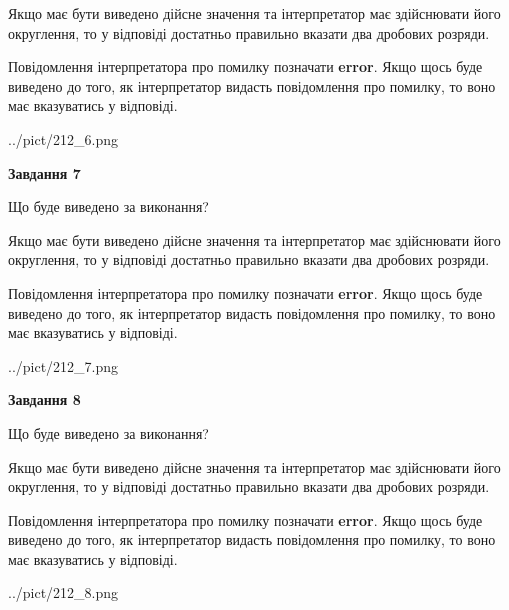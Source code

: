 \documentclass[12pt, ukrainian]{article}
\begin{document}
{\begin {Large}
Якщо має бути виведено дійсне значення та інтерпретатор має здійснювати його округлення, 
то у відповіді достатньо правильно вказати два дробових розряди.

Повідомлення інтерпретатора про помилку позначати \textbf{error}.
Якщо щось буде виведено до того, як інтерпретатор видасть повідомлення про помилку, 
то воно має вказуватись у відповіді. \par

\begin{center}
	{../pict/212_6.png}
\end{center}
\newpage

{\begin {center}\textbf{Завдання 7}\end {center}}\par
Що буде виведено за виконання? \par

Якщо має бути виведено дійсне значення та інтерпретатор має здійснювати його округлення, 
то у відповіді достатньо правильно вказати два дробових розряди.

Повідомлення інтерпретатора про помилку позначати \textbf{error}.
Якщо щось буде виведено до того, як інтерпретатор видасть повідомлення про помилку, 
то воно має вказуватись у відповіді. \par

\begin{center}
	{../pict/212_7.png}
\end{center}
\newpage

{\begin {center}\textbf{Завдання 8}\end {center}}\par
Що буде виведено за виконання? \par

Якщо має бути виведено дійсне значення та інтерпретатор має здійснювати його округлення, 
то у відповіді достатньо правильно вказати два дробових розряди.

Повідомлення інтерпретатора про помилку позначати \textbf{error}.
Якщо щось буде виведено до того, як інтерпретатор видасть повідомлення про помилку, 
то воно має вказуватись у відповіді. \par

\begin{center}
	{../pict/212_8.png}
\end{center}
\newpage


\end{Large}}
\end{document}
